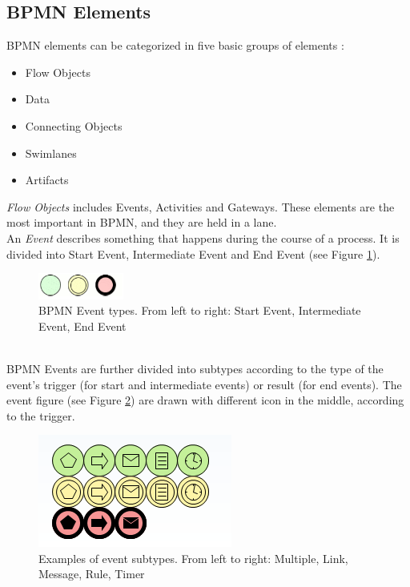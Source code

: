 \subsection{BPMN Elements}
BPMN elements can be categorized in five basic groups of elements\cite{BPMN2} :
\begin{itemize}
	\item Flow Objects
	\item Data
	\item Connecting Objects
	\item Swimlanes
	\item Artifacts
\end{itemize}
\textit{Flow Objects} includes Events, Activities and Gateways. These elements are the most important in BPMN, and they are held in a lane.\\
An \textit{Event} describes something that happens during the course of a process. It is divided into Start Event, Intermediate Event and End Event (see Figure \ref{fig:events}).
\begin{figure}[h]
	\centering
	\includegraphics[width=0.25\textwidth]{images/events.png}
	\caption{BPMN Event types. From left to right: Start Event, Intermediate Event, End Event}
	\label{fig:events}
\end{figure}
\\
BPMN Events are further divided into subtypes according to the type of the event's trigger (for start and intermediate events) or result (for end events). The event figure (see Figure \ref{fig:event_subtypes}) are drawn with different icon in the middle, according to the trigger.
\begin{figure}[h]
	\centering
	\includegraphics{images/event_types.png}
	\caption{Examples of event subtypes. From left to right: Multiple, Link, Message, Rule, Timer}
	\label{fig:event_subtypes}
\end{figure}
 
